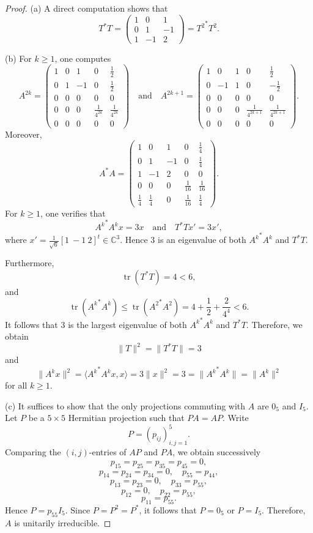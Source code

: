 \documentclass[11pt]{article}
\numberwithin{equation}{section}
\def\IC{{\mathbb C}}
\begin{document}
\begin{proof}
(a) A direct computation shows that
\[
T^*T=
\begin{pmatrix}
1&  0& 1\\
0&  1& -1\\
1&  -1& 2
\end{pmatrix}
= {T^2}^*T^2.
\]

(b) For $k\ge 1$, one computes
\[
A^{2k}=
\begin{pmatrix}
1&  0&  1&  0& \frac{1}{2}\\
0&  1&  -1&  0& \frac{1}{2}\\
0&  0&  0&  0& 0\\
0&  0&  0&  \frac{1}{4^{2k}}& \frac{1}{4^{2k}}\\
0&  0&  0&  0& 0
\end{pmatrix}
\quad \mbox{and} \quad
A^{2k+1}=
\begin{pmatrix}
1&  0&  1&  0& \frac{1}{2}\\
0&  -1&  1&  0& -\frac{1}{2}\\
0&  0&  0&  0& 0\\
0&  0&  0&  \frac{1}{4^{2k+1}}& \frac{1}{4^{2k+1}}\\
0&  0&  0&  0& 0
\end{pmatrix}.
\]
Moreover,
\[
A^*A=
\begin{pmatrix}
1&  0&  1&  0& \frac{1}{4}\\
0&  1&  -1&  0& \frac{1}{4}\\
1&  -1&  2&  0& 0\\
0&  0&  0&  \frac{1}{16}& \frac{1}{16}\\
\frac{1}{4}&  \frac{1}{4}&  0&  \frac{1}{16}& \frac{1}{4}
\end{pmatrix}.
\]
For $k\ge 1$, one verifies that
\[
{A^k}^*A^k x = 3x
\quad \mbox{and} \quad
T^*T x' = 3x',
\]
where $x'=\frac{1}{\sqrt{6}}[1 \ -1 \ 2]^t\in\IC^3$. Hence $3$ is an eigenvalue of both ${A^k}^*A^k$ and $T^*T$.

Furthermore,
\[
\operatorname{tr}(T^*T)=4<6,
\]
and
\[
\operatorname{tr}({A^k}^*A^k)\le \operatorname{tr}({A^2}^*A^2)
=4+\frac{1}{2}+\frac{2}{4^4}<6.
\]
It follows that $3$ is the largest eigenvalue of both ${A^k}^*A^k$ and $T^*T$. Therefore, we obtain
\[
\|T\|^2=\|T^*T\|=3
\]
and
\[
\|A^k x\|^2
=\langle {A^k}^*A^k x,x\rangle
=3\|x\|^2
=3
=\|{A^k}^*A^k\|
=\|A^k\|^2
\]
for all $k\ge 1$.

(c) It suffices to show that the only projections commuting with $A$ are $0_5$ and $I_5$. Let $P$ be a $5\times 5$ Hermitian projection such that $PA=AP$. Write
\[
P=(p_{ij})_{i,j=1}^5.
\]
Comparing the $(i,j)$-entries of $AP$ and $PA$, we obtain successively
\[
p_{15}=p_{25}=p_{35}=p_{45}=0,
\]
\[
p_{14}=p_{24}=p_{34}=0,\quad p_{55}=p_{44},
\]
\[
p_{13}=p_{23}=0,\quad p_{33}=p_{55},
\]
\[
p_{12}=0,\quad p_{22}=p_{55},
\]
\[
p_{11}=p_{55}.
\]
Hence $P=p_{55}I_5$. Since $P=P^2=P^*$, it follows that $P=0_5$ or $P=I_5$. Therefore, $A$ is unitarily irreducible.
\end{proof}
\end{document}
